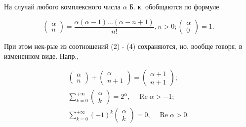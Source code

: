 \documentclass[10pt]{article}
\begin{document}
На случай любого комплексного числа $\alpha$ Б. к. обобщаются по формуле



\[

\left(\begin{array}{l}

\alpha \\

n

\end{array}\right)=\frac{\alpha(\alpha-1) \ldots(\alpha-n+1)}{n !}, n>0 ;\left(\begin{array}{l}

\alpha \\

0

\end{array}\right)=1 .

\]



При этом нек-рые из соотношений (2) - (4) сохраняются, но, вообще говоря, в измененном виде. Напр.,



\[

\begin{gathered}

\left(\begin{array}{l}

\alpha \\

n

\end{array}\right)+\left(\begin{array}{c}

\alpha \\

n+1

\end{array}\right)=\left(\begin{array}{l}

\alpha+1 \\

n+1

\end{array}\right) ; \\

\sum_{k=0}^{+\infty}\left(\begin{array}{l}

\alpha \\

k

\end{array}\right)=2^{\alpha}, \quad \operatorname{Re} \alpha>-1 ; \\

\sum_{k=0}^{+\infty}(-1)^{k}\left(\begin{array}{l}

\alpha \\

k

\end{array}\right)=0, \quad \operatorname{Re} \alpha>0 .

\end{gathered}

\]
\end{document}
